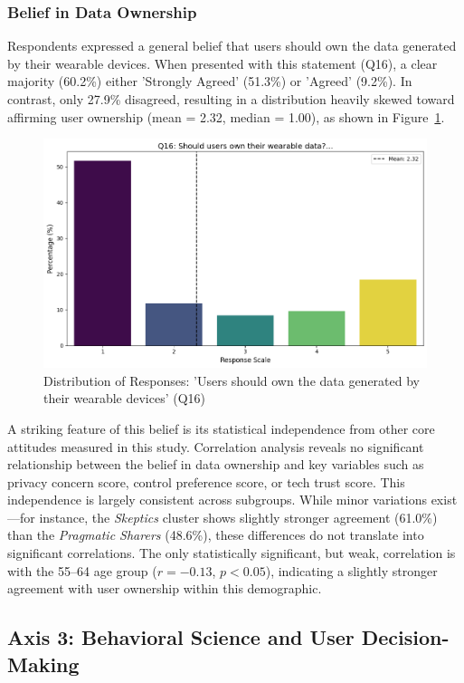 	\subsubsection{Belief in Data Ownership}
		Respondents expressed a general belief that users should own the data generated by their wearable devices. When presented with this statement (Q16), a clear majority (60.2\%) either 'Strongly Agreed' (51.3\%) or 'Agreed' (9.2\%). In contrast, only 27.9\% disagreed, resulting in a distribution heavily skewed toward affirming user ownership (mean = 2.32, median = 1.00), as shown in Figure~\ref{fig:Q16_data_ownership}.
		\begin{figure}[ht]\centering
			\includegraphics[width=1\linewidth]{figures/questions/Q16_likert.png}
			\caption{Distribution of Responses: 'Users should own the data generated by their wearable devices' (Q16)}
			\label{fig:Q16_data_ownership}
		\end{figure}
		A striking feature of this belief is its statistical independence from other core attitudes measured in this study. Correlation analysis reveals no significant relationship between the belief in data ownership and key variables such as privacy concern score, control preference score, or tech trust score. This independence is largely consistent across subgroups. While minor variations exist—for instance, the \textit{Skeptics} cluster shows slightly stronger agreement (61.0\%) than the \textit{Pragmatic Sharers} (48.6\%), these differences do not translate into significant correlations. The only statistically significant, but weak, correlation is with the 55--64 age group ($r = -0.13$, $p < 0.05$), indicating a slightly stronger agreement with user ownership within this demographic.
\subsection{Axis 3: Behavioral Science and User Decision-Making}
